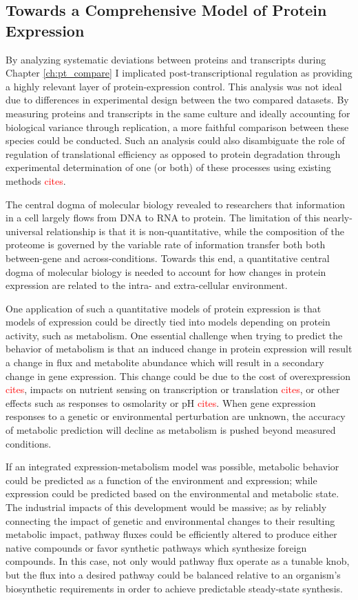 \subsection{Towards a Comprehensive Model of Protein Expression}

By analyzing systematic deviations between proteins and transcripts during Chapter \ref{ch:pt_compare} I implicated post-transcriptional regulation as providing a highly relevant layer of protein-expression control. This analysis was not ideal due to differences in experimental design between the two compared datasets. By measuring proteins and transcripts in the same culture and ideally accounting for biological variance through replication, a more faithful comparison between these species could be conducted.  Such an analysis could also disambiguate the role of regulation of translational efficiency as opposed to protein degradation through experimental determination of one (or both) of these processes using existing methods \textcolor{red}{cites}.

The central dogma of molecular biology revealed to researchers that information in a cell largely flows from DNA to RNA to protein. The limitation of this nearly-universal relationship is that it is non-quantitative, while the composition of the proteome is governed by the variable rate of information transfer both both between-gene and across-conditions. Towards this end, a quantitative central dogma of molecular biology is needed to account for how changes in protein expression are related to the intra- and extra-cellular environment.

One application of such a quantitative models of protein expression is that models of expression could be directly tied into models depending on protein activity, such as metabolism.  One essential challenge when trying to predict the behavior of metabolism is that an induced change in protein expression will result a change in flux and metabolite abundance which will result in a secondary change in gene expression. This change could be due to the cost of overexpression \textcolor{red}{cites}, impacts on nutrient sensing on transcription or translation \textcolor{red}{cites}, or other effects such as responses to osmolarity or pH \textcolor{red}{cites}. When gene expression responses to a genetic or environmental perturbation are unknown, the accuracy of metabolic prediction will decline as metabolism is pushed beyond measured conditions.

If an integrated expression-metabolism model was possible, metabolic behavior could be predicted as a function of the environment and expression; while expression could be predicted based on the environmental and metabolic state. The industrial impacts of this development would be massive; as by reliably connecting the impact of genetic and environmental changes to their resulting metabolic impact, pathway fluxes could be efficiently altered to produce either native compounds or favor synthetic pathways which synthesize foreign compounds. In this case, not only would pathway flux operate as a tunable knob, but the flux into a desired pathway could be balanced relative to an organism's biosynthetic requirements in order to achieve predictable steady-state synthesis.

